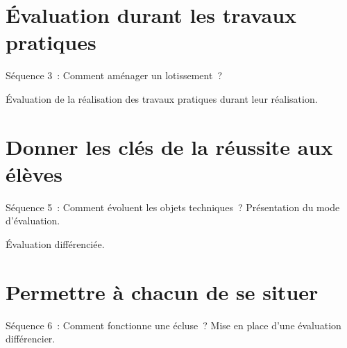 

\section{Évaluation durant les travaux pratiques}
Séquence 3~: Comment aménager un lotissement~?

Évaluation de la réalisation des travaux pratiques durant leur réalisation.


\section{Donner les clés de la réussite aux élèves }
Séquence 5~: Comment évoluent les objets techniques~?
Présentation du mode d'évaluation.

Évaluation différenciée.


\section{Permettre à chacun de se situer }
Séquence 6~: Comment fonctionne une écluse~?
Mise en place d'une évaluation différencier.



